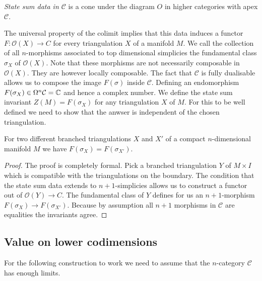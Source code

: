 \begin{definition}
	\emph{State sum data in $\mathcal{C}$} is a cone under the diagram $O$ in higher categories with apex $\mathcal{C}$.
\end{definition}

The universal property of the colimit implies that this data induces a functor $F\colon \mathcal{O}(X)\longrightarrow C $ for every triangulation $X$ of a manifold $M$.
We call the collection of all $n$-morphisms associated to top dimensional simplicies the fundamental class $\sigma_X$ of $\mathcal{O}(X)$.
Note that these morphisms are not necessarily composable in $\mathcal{O}(X)$.
They are however locally composable.
The fact that $\mathcal{C}$ is fully dualisable
allows us to compose the image $F(\sigma)$ inside $\mathcal{C}$.
Defining an endomorphism
$F(\sigma_X)\in \Omega^n\mathcal{C}=\mathbb{C} $ and hence a complex number.
We define the state sum invariant $Z(M)=F(\sigma_X)$ for any triangulation $X$ of $M$.
For this to be well defined we need to show that the anwser is independent of the chosen triangulation.

\begin{theorem}
For two different branched triangulations $X$ and $X'$ of a compact $n$-dimensional manifold $M$ we have $F(\sigma_X)=F(\sigma_{X'})$.
\end{theorem}
\begin{proof}
The proof is completely formal.
Pick a branched triangulation $Y$ of $M\times I$ which is compatible with the triangulations on the boundary.
The condition that the state sum data extends to $n+1$-simplicies allows us to construct a functor out of $\mathcal{O}(Y)\longrightarrow C $.
The fundamental class of $Y$ defines for us an $n+1$-morphism $F(\sigma_X)\longrightarrow F(\sigma_{X'})$.
Because by assumption all $n+1$ morphisms in $\mathcal{C}$ are equalities the invariants agree.

\end{proof}
\begin{remark}
\end{remark}



\subsection{Value on lower codimensions}
For the following construction to work we need to assume that the $n$-category $\mathcal{C}$ has enough limits.


